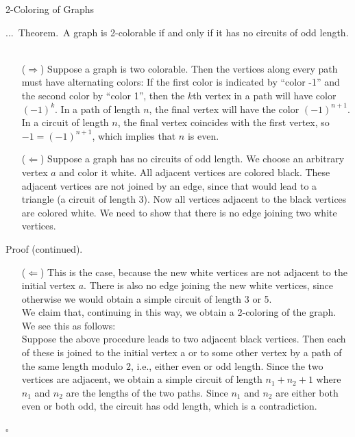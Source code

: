 \documentclass[smaller,hyperref={CJKbookmarks=true}]{beamer}
\newenvironment{PROOF}{{\noindent\!\sf\alert{Proof.}}\\}{\hfill$\square$\\}
\newcounter{zhuo}[subsection]
\renewcommand{\thezhuo}{\thesection.\thesubsection.\arabic{zhuo}}
\newenvironment{THEOREM}{\stepcounter{zhuo}\alert{\thezhuo.~Theorem.\,}}{}
\begin{document}
\begin{frame}{2-Coloring of Graphs}
\begin{spacing}{1.05}
\begin{THEOREM}
A graph is 2-colorable if and only if it has no circuits of odd length.\\[6pt]
\end{THEOREM}
\begin{PROOF}
\begin{itemize}
  \item[($\Rightarrow$)] Suppose a graph is two colorable. Then the vertices along every path
      must have alternating colors: If the first color is indicated by ``color -1'' and the second color by ``color 1'', then the $k$th vertex in a path will have color $(-1)^k$. In a path of length $n$, the final vertex will have the color $(-1)^{n+1}$. In a circuit of length $n$, the final vertex coincides with the first vertex, so $-1=(-1)^{n+1}$, which implies that $n$ is even.
  \item[($\Leftarrow$)] Suppose a graph has no circuits of odd length. We choose an
      arbitrary vertex $a$ and color it white. All adjacent vertices are colored black. These adjacent vertices are not joined by an edge, since that would lead to a triangle (a circuit of length 3). Now all vertices adjacent to the black vertices are colored white. We need to show that there is no edge joining two white vertices.
\end{itemize}
\newpage
\alert{Proof (continued).}\\[3pt]
\begin{itemize}
  \item[($\Leftarrow$)] This is the case, because the new white vertices are not adjacent to
the initial vertex $a$. There is also no edge joining the new white
vertices, since otherwise we would obtain a simple circuit of length 3
or 5.\\[4pt]
We claim that, continuing in this way, we obtain a 2-coloring of the
graph. We see this as follows:\\[4pt]
Suppose the above procedure leads to two adjacent black vertices.
Then each of these is joined to the initial vertex a or to some other
vertex by a path of the same length modulo 2, i.e., either even or odd
length. Since the two vertices are adjacent, we obtain a simple circuit
of length $n_1+n_2+1$ where $n_1$ and $n_2$ are the lengths of the two
paths. Since $n_1$ and $n_2$ are either both even or both odd, the circuit
has odd length, which is a contradiction.
\end{itemize}
\end{PROOF}
\end{spacing}
\end{frame}
\end{document}
